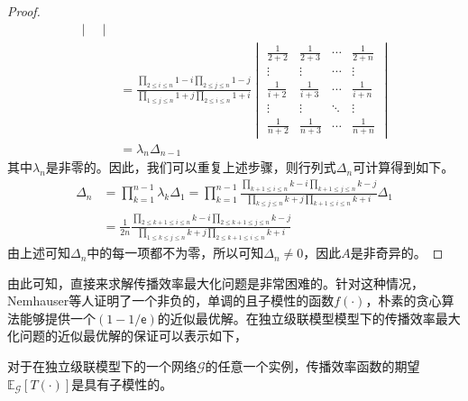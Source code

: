 \begin{proof}
\begin{equation}
\begin{split}
\begin{vmatrix}
    \end{vmatrix}\\
    & = \frac{\prod\limits_{2\leq i \leq n}{1-i}\prod\limits_{2\leq j \leq n}{1-j}}{\prod\limits_{1\leq j \leq n}{1+j}\prod\limits_{2\leq i \leq n}{1+i}}
    \begin{vmatrix}
    \frac{1}{2+2} & \frac{1}{2+3} & \cdots & \frac{1}{2+n}\\
    \vdots & \vdots & \cdots & \vdots \\
    \frac{1}{i+2} & \frac{1}{i+3} & \cdots & \frac{1}{i+n}\\
    \vdots & \vdots & \ddots & \vdots \\
    \frac{1}{n+2} & \frac{1}{n+3} & \cdots & \frac{1}{n+n}
    \end{vmatrix}\\ 
    &= \lambda_{n} \Delta_{n-1}
\end{split}
\end{equation}
其中$\lambda_{n}$是非零的。因此，我们可以重复上述步骤，则行列式$\Delta_n$可计算得到如下。
\begin{equation}\label{eq:detetminant4}
\begin{split}
    \Delta_n &= \prod\limits_{k=1}^{n-1}{\lambda_k}\Delta_1=\prod\limits_{k=1}^{n-1}{\frac{\prod\limits_{k+1 \leq i \leq n}{k-i}\prod\limits_{k+1 \leq j \leq n}{k-j}}{\prod\limits_{k \leq j \leq n}{k+j}\prod\limits_{k+1 \leq i \leq n}{k+i}}}\Delta_1\\
    & = \frac{1}{2n}\frac{\prod\limits_{2\leq k+1\leq i \leq n}{k-i}\prod\limits_{2\leq k+1\leq j \leq n}{k-j}}{\prod\limits_{1\leq k\leq j \leq n}{k+j}\prod\limits_{2\leq k+1\leq i \leq n}{k+i}}
\end{split}
\end{equation}
由上述可知$\Delta_n$中的每一项都不为零，所以可知$\Delta_n \neq 0$，因此$A$是非奇异的。
\end{proof}

由此可知，直接来求解传播效率最大化问题是非常困难的。针对这种情况，Nemhauser等人证明了一个非负的，单调的且子模性的函数$f(\cdot)$，朴素的贪心算法能够提供一个$(1-1/\textsf{e})$的近似最优解。在独立级联模型模型下的传播效率最大化问题的近似最优解的保证可以表示如下，
\begin{mytheo}\label{theo:submodular}
对于在独立级联模型下的一个网络$\mathcal{G}$的任意一个实例，传播效率函数的期望$\mathbb{E}_\mathcal{G}\left[T\left(\cdot\right)\right]$是具有子模性的。
\end{mytheo}

